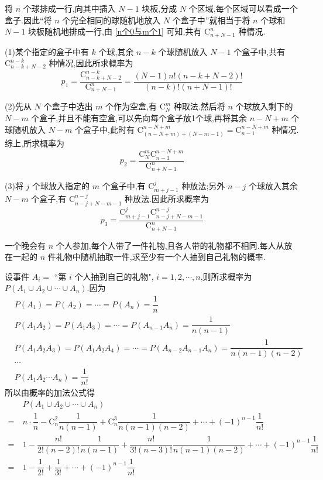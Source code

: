 \begin{solution}
    将 $n$ 个球排成一行,向其中插入 $N-1$ 块板,分成 $N$ 个区域,每个区域可以看成一个盒子.因此``将 $n$ 个完全相同的球随机地放入 $N$ 个盒子中''就相当于将 $n$ 个球和 $N-1$ 块板随机地排成一行,由 \ref{n个0与m个1} 可知,共有 $\mathrm{C}_{n+N-1}^n$ 种情况.

    (1)某个指定的盒子中有 $k$ 个球,其余 $n-k$ 个球随机放入 $N-1$ 个盒子中,共有 $\mathrm{C}_{n-k+N-2}^{n-k}$ 种情况,因此所求概率为
    $$
    p_1 = \dfrac{\mathrm{C}_{n-k+N-2}^{n-k}}{\mathrm{C}_{n+N-1}^n} = \dfrac{(N-1) n! (n-k+N-2)!}{(n-k)! (n+N-1)!}
    $$

    (2)先从 $N$ 个盒子中选出 $m$ 个作为空盒,有 $\mathrm{C}_N^m$ 种取法.然后将 $n$ 个球放入剩下的 $N-m$ 个盒子,并且不能有空盒,可以先向每个盒子放1个球,再将其余 $n-N+m$ 个球随机放入 $N-m$ 个盒子中,此时有 $\mathrm{C}_{(n-N+m)+(N-m-1)}^{n-N+m} = \mathrm{C}_{n-1}^{n-N+m}$ 种情况.综上,所求概率为
    $$
    p_2 = \dfrac{\mathrm{C}_N^m \mathrm{C}_{n-1}^{n-N+m}}{\mathrm{C}_{n+N-1}^n}
    $$

    (3)将 $j$ 个球放入指定的 $m$ 个盒子中,有 $\mathrm{C}_{m+j-1}^j$ 种放法;另外 $n-j$ 个球放入其余 $N-m$ 个盒子,有 $\mathrm{C}_{n-j+N-m-1}^{n-j}$ 种放法.因此所求概率为
    $$
    p_3 = \dfrac{\mathrm{C}_{m+j-1}^j \mathrm{C}_{n-j+N-m-1}^{n-j}}{\mathrm{C}_{n+N-1}^n}
    $$
\end{solution}

\question[配对问题] 一个晚会有 $n$ 个人参加,每个人带了一件礼物,且各人带的礼物都不相同.每人从放在一起的 $n$ 件礼物中随机抽取一件,求至少有一个人抽到自己礼物的概率.

\begin{solution}
    设事件 $A_i=$ ``第 $i$ 个人抽到自己的礼物", $i=1,2,\cdots,n$,则所求概率为 $P(A_1 \cup A_2 \cup \cdots \cup A_n)$.因为
    $$
    \begin{aligned}
        & P(A_1) = P(A_2) = \cdots = P(A_n) = \dfrac{1}{n} \\
        & P(A_1 A_2) = P(A_1 A_3) = \cdots = P(A_{n-1} A_n) = \dfrac{1}{n(n-1)} \\
        & P(A_1 A_2 A_3) = P(A_1 A_2 A_4) = \cdots = P(A_{n-2} A_{n-1} A_n) = \dfrac{1}{n(n-1)(n-2)} \\
        & \cdots \\
        & P(A_1 A_2 \cdots A_n) = \dfrac{1}{n!}
    \end{aligned}
    $$
    所以由概率的加法公式得
    $$
    \begin{aligned}
        & P(A_1 \cup A_2 \cup \cdots \cup A_n) \\
        =\ & n \cdot \dfrac{1}{n} - \mathrm{C}_n^2 \dfrac{1}{n(n-1)} + \mathrm{C}_n^3 \dfrac{1}{n(n-1)(n-2)} + \cdots + (-1)^{n-1} \dfrac{1}{n!} \\
        =\ & 1 - \dfrac{n!}{2! (n-2)!} \dfrac{1}{n(n-1)} + \dfrac{n!}{3! (n-3)!} \dfrac{1}{n(n-1)(n-2)} + \cdots + (-1)^{n-1} \dfrac{1}{n!} \\
        =\ & 1 - \dfrac{1}{2!} + \dfrac{1}{3!} + \cdots + (-1)^{n-1} \dfrac{1}{n!} \\
    \end{aligned}
    $$
\end{solution}

